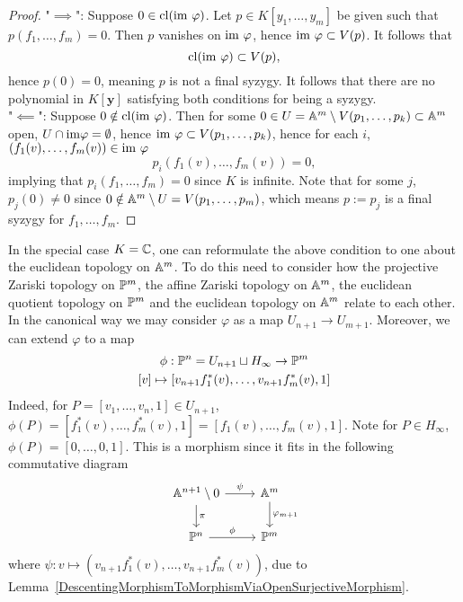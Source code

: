         \begin{proof}
            "$\implies$": Suppose $0\in \mathrm{cl}(\mathrm{im} \ \varphi)$. Let $p\in K[y_1,\dots,y_m]$ be given such that $p(f_1,\dots,f_m)=0$. Then $p$ vanishes on $\mathrm{im}\ \varphi$, hence $\mathrm{im}\ \varphi \subset V(p)$. It follows that 
            $$\mathrm{cl}(\mathrm{im}\ \varphi)\subset V(p),$$
            hence $p(0)=0$, meaning $p$ is not a final syzygy. It follows that there are no polynomial in $K[\mathbf{y}]$ satisfying both conditions for being a syzygy.\\
            "$\impliedby$": Suppose $0\notin \mathrm{cl}(\mathrm{im} \ \varphi)$. Then for some $0\in U= \mathbb{A}^m\setminus V(p_1,\dots,p_k)\subset \mathbb{A}^m$ open, $U\cap \mathrm{im} \varphi = \emptyset$, hence $\mathrm{im}\ \varphi \subset V(p_1,\dots,p_k)$, hence for each $i$, $(f_1(v),\dots,f_m(v))\in \mathrm{im}\ \varphi$
            $$p_i(f_1(v),\dots,f_m(v))=0,$$
            implying that $p_i(f_1,\dots,f_m)=0$ since $K$ is infinite. Note that for some $j$, $p_j(0)\neq 0$ since $0\notin \mathbb{A}^m\setminus U = V(p_1,\dots,p_m)$, which means $p:=p_j$ is a final syzygy for $f_1,\dots,f_m$.
        \end{proof}
        In the special case $K=\mathbb{C}$, one can reformulate the above condition to one about the euclidean topology on $\mathbb{A}^m$. To do this need to consider how the projective Zariski topology on $\mathbb{P}^m$, the affine Zariski topology on $\mathbb{A}^m$, the euclidean quotient topology on $\mathbb{P}^m$ and the euclidean topology on $\mathbb{A}^m$ relate to each other. In the canonical way we may consider $\varphi$ as a map $U_{n+1}\rightarrow U_{m+1}$. Moreover, we can extend $\varphi$ to a map 
        \begin{gather*}
            \phi : \mathbb{P}^n= U_{n+1} \sqcup H_\infty \rightarrow \mathbb{P}^m\\
            [v] \mapsto [v_{n+1}f_1^\ast(v),\dots,v_{n+1}f_m^\ast(v), 1]
        \end{gather*}
        Indeed, for $P=[v_1,\dots,v_n,1]\in U_{n+1}$, $\phi(P)=[f_1^\ast(v),\dots,f_m^\ast(v),1]=[f_1(v),\dots,f_m(v),1]$. Note for $P\in H_\infty$, $\phi(P)=[0,\dots,0,1]$. This is a morphism since it fits in the following commutative diagram
        $$\begin{tikzcd}
            \A^{n+1}\setminus 0 \arrow[d,"\pi"] \arrow[r,"\psi"] & \A^m \arrow[d,"\varphi_{m+1}"]\\
            \Pp^{n} \arrow[r, "\phi"] & \Pp^m
        \end{tikzcd}$$
        where $\psi: v\mapsto \left(v_{n+1}f_1^\ast(v),\dots,v_{n+1}f_m^\ast(v)\right)$, due to Lemma~\ref{DescentingMorphismToMorphismViaOpenSurjectiveMorphism}.
        
